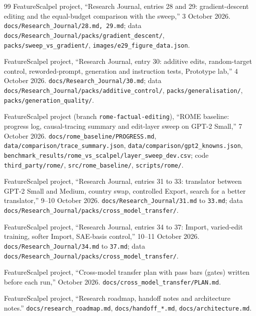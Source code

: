 \begin{thebibliography}{99}
 FeatureScalpel project, ``Research Journal, entries 28 and 29: gradient-descent editing and the equal-budget comparison with the sweep,'' 3 October 2026. \texttt{docs/Research\_Journal/28.md, 29.md}; data \texttt{docs/Research\_Journal/packs/gradient\_descent/}, \texttt{packs/sweep\_vs\_gradient/}, \texttt{images/e29\_figure\_data.json}.

 FeatureScalpel project, ``Research Journal, entry 30: additive edits, random-target control, reworded-prompt, generation and instruction tests, Prototype lab,'' 4 October 2026. \texttt{docs/Research\_Journal/30.md}; data \texttt{docs/Research\_Journal/packs/additive\_control/}, \texttt{packs/generalisation/}, \texttt{packs/generation\_quality/}.

 FeatureScalpel project (branch \texttt{rome-factual-editing}), ``ROME baseline: progress log, causal-tracing summary and edit-layer sweep on GPT-2 Small,'' 7 October 2026. \texttt{docs/rome\_baseline/PROGRESS.md}, \texttt{data/comparison/trace\_summary.json}, \texttt{data/comparison/gpt2\_knowns.json}, \texttt{benchmark\_results/rome\_vs\_scalpel/layer\_sweep\_dev.csv}; code \texttt{third\_party/rome/}, \texttt{src/rome\_baseline/}, \texttt{scripts/rome/}.

 FeatureScalpel project, ``Research Journal, entries 31 to 33: translator between GPT-2 Small and Medium, country swap, controlled Export, search for a better translator,'' 9--10 October 2026. \texttt{docs/Research\_Journal/31.md} to \texttt{33.md}; data \texttt{docs/Research\_Journal/packs/cross\_model\_transfer/}.

 FeatureScalpel project, ``Research Journal, entries 34 to 37: Import, varied-edit training, softer Import, SAE-basis control,'' 10--11 October 2026. \texttt{docs/Research\_Journal/34.md} to \texttt{37.md}; data \texttt{docs/Research\_Journal/packs/cross\_model\_transfer/}.

 FeatureScalpel project, ``Cross-model transfer plan with pass bars (gates) written before each run,'' October 2026. \texttt{docs/cross\_model\_transfer/PLAN.md}.

 FeatureScalpel project, ``Research roadmap, handoff notes and architecture notes.'' \texttt{docs/research\_roadmap.md}, \texttt{docs/handoff\_*.md}, \texttt{docs/architecture.md}.
\end{thebibliography}
\endgroup
